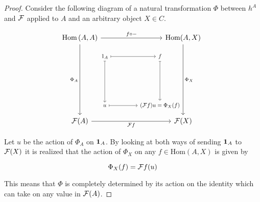 \documentclass[../../main.tex]{subfiles}
\begin{document}
    \begin{proof}
        Consider the following diagram of a natural transformation $\Phi$ between $h^A$ and $\functor{F}$ applied to $A$ and an arbitrary object $X \in C$. 
        
            \[ 
            \stackinset{l}{13ex}{b}{6ex}{%
                \scalebox{.8}
                {%
                    \begin{tikzcd}[row sep=16ex, column sep = 11ex, ampersand replacement=\&]
                        1_A
                        \arrow[mapsto]{r}
                        \arrow[mapsto]{d}
                        \& f
                        \arrow[mapsto]{d}  \\
                        u
                        \arrow[mapsto]{r}
                        \& (\functor{F}f)u=\Phi_X(f)
                    \end{tikzcd}
                }
            }{%
                \begin{tikzcd}[row sep = 23ex, column sep = 20ex, ampersand replacement=\&]
                    \Hom \left(A,A\right)
                    \arrow{r}{f\circ-}
                    \arrow[swap]{d}{\Phi_A}
                    \& \Hom(A,X)
                    \arrow{d}{\Phi_X}  \\
                    \functor{F}(A)
                    \arrow[swap]{r}{\functor{F}f}
                    \& \functor{F}(X)
                \end{tikzcd}
            }
            \]

        Let $u$ be the action of $\Phi_A$ on $\idarrow[A]$. By looking at both ways of sending $\idarrow[A]$ to $\functor{F}(X)$ it is realized that the action of $\Phi_X$ on any $f \in \mathrm{Hom}(A, X)$ is given by 

        \begin{equation}
            \Phi_X(f) = \functor{F}f(u)
        \end{equation}
        
        This means that $\Phi$ is completely determined by its action on the identity which can take on any value in $\functor{F}(A)$.
    \end{proof}
\end{document}
